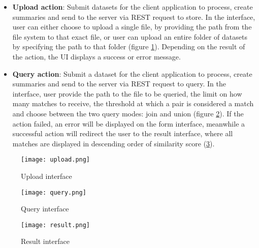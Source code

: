 \begin{itemize}
    \item \textbf{Upload action}: Submit datasets for the client application to process, create summaries and send to the server via REST request to store. In the interface, user can either choose to upload a single file, by providing the path from the file system to that exact file, or user can upload an entire folder of datasets by specifying the path to that folder (figure \ref{fig:upload}). Depending on the result of the action, the UI displays a success or error message.
    \item \textbf{Query action}: Submit a dataset for the client application to process, create summaries and send to the server via REST request to query. In the interface, user provide the path to the file to be queried, the limit on how many matches to receive, the threshold at which a pair is considered a match and choose between the two query modes: join and union (figure \ref{fig:query}). If the action failed, an error will be displayed on the form interface, meanwhile a successful action will redirect the user to the result interface, where all matches are displayed in descending order of similarity score (\ref{fig:result}). 
\end{itemize}

\begin{figure}
    \centering
    \texttt{[image: upload.png]}
    \caption{Upload interface}
    \label{fig:upload}
\end{figure}

\begin{figure}
    \centering
    \texttt{[image: query.png]}
    \caption{Query interface}
    \label{fig:query}
\end{figure}

\begin{figure}
    \centering
    \texttt{[image: result.png]}
    \caption{Result interface}
    \label{fig:result}
\end{figure}